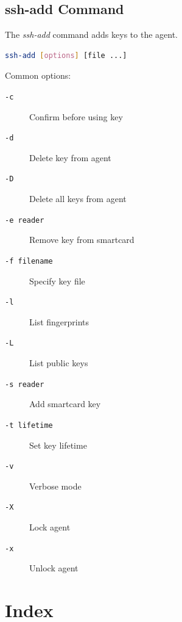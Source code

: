 \documentclass[12pt]{book}
\begin{document}
\section{ssh-add Command}

The \textit{ssh-add} command adds keys to the agent.

\begin{lstlisting}[language=bash]
ssh-add [options] [file ...]
\end{lstlisting}

Common options:
\begin{description}
    \item[\texttt{-c}] Confirm before using key
    \item[\texttt{-d}] Delete key from agent
    \item[\texttt{-D}] Delete all keys from agent
    \item[\texttt{-e reader}] Remove key from smartcard
    \item[\texttt{-f filename}] Specify key file
    \item[\texttt{-l}] List fingerprints
    \item[\texttt{-L}] List public keys
    \item[\texttt{-s reader}] Add smartcard key
    \item[\texttt{-t lifetime}] Set key lifetime
    \item[\texttt{-v}] Verbose mode
    \item[\texttt{-X}] Lock agent
    \item[\texttt{-x}] Unlock agent
\end{description}

\chapter{Index}

\end{document}

